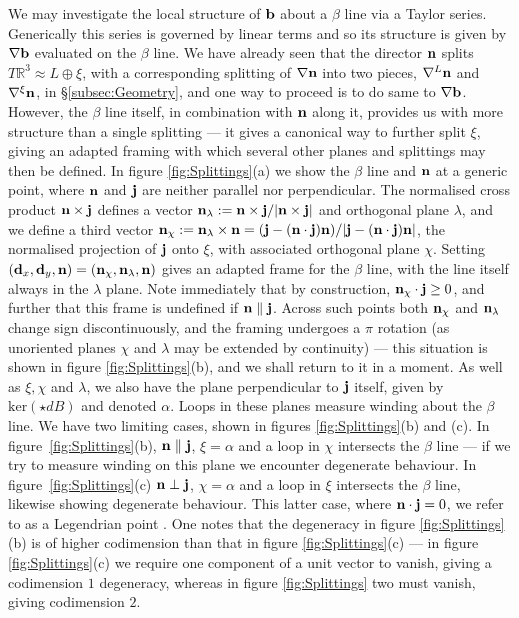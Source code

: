 We may investigate the local structure of $\mathbf{b}$ about a $\beta$ line via a Taylor series. Generically this series is governed by linear terms and so its structure is given by $\nabla \mathbf{b}$ evaluated on the $\beta$ line. We have already seen that the director $\mathbf{n}$ splits $T \mathbb{R}^3\approx L \oplus \xi$, with a corresponding splitting of $\nabla \mathbf{n}$ into two pieces, $\nabla^L \mathbf{n} $ and $\nabla^\xi \mathbf{n}$, in \S\ref{subsec:Geometry}, and one way to proceed is to do same to $\nabla \mathbf{b}$. However, the $\beta$ line itself, in combination with $\mathbf{n}$ along it, provides us with more structure than a single splitting --- it gives a canonical way to further split $\xi$, giving an adapted framing with which several other planes and splittings may then be defined. In figure \ref{fig:Splittings}(a) we show the $\beta$ line and $\mathbf{n}$ at a generic point, where $\mathbf{n}$ and $\mathbf{j}$ are neither parallel nor perpendicular. The normalised cross product $\mathbf{n} \times \mathbf{j}$ defines a vector $\mathbf{n}_\lambda := \mathbf{n} \times \mathbf{j}/| \mathbf{n} \times \mathbf{j}|$ and orthogonal plane $\lambda$, and we define a third vector $\mathbf{n}_\chi := \mathbf{n}_\lambda \times \mathbf{n} = (\mathbf{j} - (\mathbf{n}\cdot \mathbf{j})\mathbf{n})/|\mathbf{j} - (\mathbf{n}\cdot \mathbf{j})\mathbf{n}|$, the normalised projection of $\mathbf{j}$ onto $\xi$, with associated orthogonal plane $\chi$. Setting $(\mathbf{d}_x, \mathbf{d}_y, \mathbf{n}) = (\mathbf{n}_\chi, \mathbf{n}_\lambda, \mathbf{n})$ gives an adapted frame for the $\beta$ line, with the line itself always in the $\lambda$ plane. Note immediately that by construction, $\mathbf{n}_\chi \cdot \mathbf{j} \geq 0$, and further that this frame is undefined if $\mathbf{n} \parallel \mathbf{j}$. Across such points both $\mathbf{n}_\chi$ and $\mathbf{n}_\lambda$ change sign discontinuously, and the framing undergoes a $\pi$ rotation (as unoriented planes $\chi$ and $\lambda$ may be extended by continuity) --- this situation is shown in figure  \ref{fig:Splittings}(b), and we shall return to it in a moment. As well as $\xi, \chi$ and $\lambda$, we also have the plane perpendicular to $\mathbf{j}$ itself, given by $\mathrm{ker}(\star dB)$ and denoted $\alpha$. Loops in these planes measure winding about the $\beta$ line. We have two limiting cases, shown in figures \ref{fig:Splittings}(b) and (c). In figure~\ref{fig:Splittings}(b), $\mathbf{n} \parallel \mathbf{j}$, $\xi = \alpha$ and a loop in $\chi$ intersects the $\beta$ line --- if we try to measure winding on this plane we encounter degenerate behaviour. In figure~\ref{fig:Splittings}(c) $\mathbf{n} \perp \mathbf{j}$, $\chi = \alpha$ and a loop in $\xi$  intersects the $\beta$ line, likewise showing degenerate behaviour. This latter case, where $\mathbf{n} \cdot \mathbf{j}= 0$, we refer to as a Legendrian point \citep{Geiges2009}. One notes that the degeneracy in figure \ref{fig:Splittings}(b) is of higher codimension than that in figure \ref{fig:Splittings}(c) --- in figure \ref{fig:Splittings}(c) we require one component of a unit vector to vanish, giving a codimension $1$ degeneracy, whereas in figure \ref{fig:Splittings} two must vanish, giving codimension $2$.
